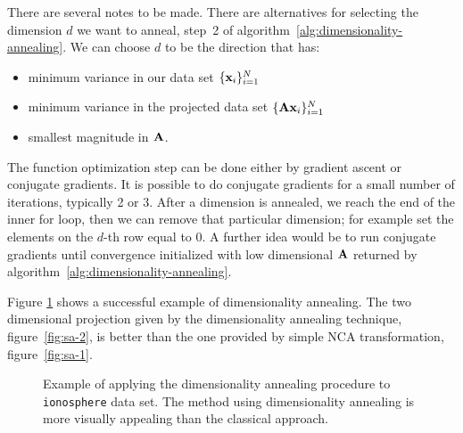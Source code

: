   There are several notes to be made. There are alternatives for selecting the dimension $d$ we want to anneal, step~2 of algorithm~\ref{alg:dimensionality-annealing}. We can choose $d$ to be the direction that has:
    \begin{itemize}
     \item minimum variance in our data set $\{\mathbf{x}_i\}_{i=1}^N$
     \item minimum variance in the projected data set $\{\mathbf{A}\mathbf{x}_i\}_{i=1}^N$
     \item smallest magnitude in $\mathbf{A}$.
    \end{itemize}

    The function optimization step can be done either by gradient ascent or conjugate gradients. It is possible to do conjugate gradients for a small number of iterations, typically 2 or 3. After a dimension is annealed, we reach the end of the inner for loop, then we can remove that particular dimension; for example set the elements on the $d$-th row equal to 0. A further idea would be to run conjugate gradients until convergence initialized with low dimensional $\mathbf{A}$ returned by algorithm~\ref{alg:dimensionality-annealing}.

    Figure \ref{fig:dimensionality-annealing} shows a successful example of dimensionality annealing. The two dimensional projection given by the dimensionality annealing technique, figure~\ref{fig:sa-2}, is better than the one provided by simple NCA transformation, figure~\ref{fig:sa-1}. 

\begin{figure}
		 \centering
			    \hspace{0.02\textwidth}
		\caption[Dimensionality annealing example]{Example of applying the dimensionality annealing procedure to \texttt{ionosphere} data set. The method using dimensionality annealing is more visually appealing than the classical approach.}
		\label{fig:dimensionality-annealing}
	\end{figure}
	
